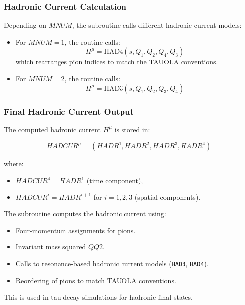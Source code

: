 \documentclass[12pt]{article}
\begin{document}
\subsubsection{Hadronic Current Calculation}

Depending on \( MNUM \), the subroutine calls different hadronic current models:
\begin{itemize}
    \item For \( MNUM = 1 \), the routine calls:
    \begin{equation}
        H^\mu = \text{HAD4}(s, Q_1, Q_2, Q_4, Q_3)
    \end{equation}
    which rearranges pion indices to match the TAUOLA conventions.
    \item For \( MNUM = 2 \), the routine calls:
    \begin{equation}
        H^\mu = \text{HAD3}(s, Q_1, Q_2, Q_3, Q_4)
    \end{equation}
\end{itemize}

\subsubsection{Final Hadronic Current Output}

The computed hadronic current \( H^\mu \) is stored in:

\begin{equation}
    HADCUR^\mu = (HADR^1, HADR^2, HADR^3, HADR^4)
\end{equation}

where:
\begin{itemize}
    \item \( HADCUR^4 = HADR^1 \) (time component),
    \item \( HADCUR^i = HADR^{i+1} \) for \( i = 1,2,3 \) (spatial components).
\end{itemize}


The subroutine computes the hadronic current using:
\begin{itemize}
    \item Four-momentum assignments for pions.
    \item Invariant mass squared \( QQ2 \).
    \item Calls to resonance-based hadronic current models (\texttt{HAD3}, \texttt{HAD4}).
    \item Reordering of pions to match TAUOLA conventions.
\end{itemize}

This is used in tau decay simulations for hadronic final states.
\end{document}
